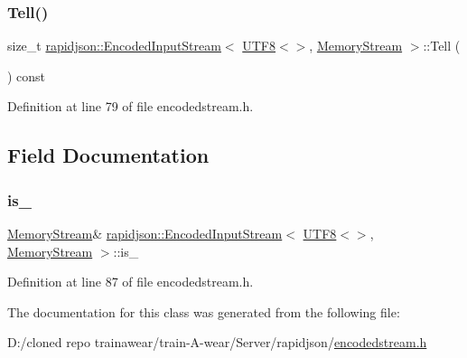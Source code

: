 \subsubsection{\texorpdfstring{Tell()}{Tell()}}
{\footnotesize\ttfamily size\+\_\+t \mbox{\hyperlink{classrapidjson_1_1_encoded_input_stream}{rapidjson\+::\+Encoded\+Input\+Stream}}$<$ \mbox{\hyperlink{structrapidjson_1_1_u_t_f8}{U\+T\+F8}}$<$$>$, \mbox{\hyperlink{structrapidjson_1_1_memory_stream}{Memory\+Stream}} $>$\+::Tell (\begin{DoxyParamCaption}{ }\end{DoxyParamCaption}) const}



Definition at line 79 of file encodedstream.\+h.


\begin{DoxyCode}{0}

\end{DoxyCode}


\subsection{Field Documentation}
\mbox{\label{classrapidjson_1_1_encoded_input_stream_3_01_u_t_f8_3_4_00_01_memory_stream_01_4_ac28dccc556d38360434cc36d4b5e7222}} 
\subsubsection{\texorpdfstring{is\_}{is\_}}
{\footnotesize\ttfamily \mbox{\hyperlink{structrapidjson_1_1_memory_stream}{Memory\+Stream}}\& \mbox{\hyperlink{classrapidjson_1_1_encoded_input_stream}{rapidjson\+::\+Encoded\+Input\+Stream}}$<$ \mbox{\hyperlink{structrapidjson_1_1_u_t_f8}{U\+T\+F8}}$<$$>$, \mbox{\hyperlink{structrapidjson_1_1_memory_stream}{Memory\+Stream}} $>$\+::is\+\_\+}



Definition at line 87 of file encodedstream.\+h.



The documentation for this class was generated from the following file\+:\begin{DoxyCompactItemize}
\item 
D\+:/cloned repo trainawear/train-\/\+A-\/wear/\+Server/rapidjson/\mbox{\hyperlink{encodedstream_8h}{encodedstream.\+h}}\end{DoxyCompactItemize}
